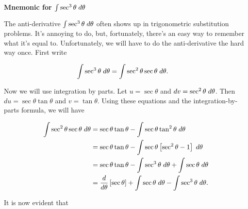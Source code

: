 \documentclass[12pt]{article}
\begin{document}

\begin{Large}
\begin{center}
    \textbf{Mnemonic for $\int \sec^3\theta \hspace{1mm} d\theta$}
\end{center}
\end{Large}

\vspace{5mm}

\noindent The anti-derivative $\int \sec^3\theta \hspace{1mm} d\theta$ often shows up in trigonometric substitution problems. It's annoying to do, but, fortunately, there's an easy way to remember what it's equal to. Unfortunately, we will have to do the anti-derivative the hard way once. First write

\begin{align*}
    \int\sec^3\theta \hspace{1mm} d\theta &= \int\sec^2\theta\sec\theta \hspace{1mm} d\theta.
\end{align*}

\noindent Now we will use integration by parts. Let $u=\sec\theta$ and $dv = \sec^2\theta \hspace{1mm} d\theta$. Then $du = \sec\theta\tan\theta$ and $v=\tan\theta$. Using these equations and the integration-by-parts formula, we will have

\begin{align*}
    \int\sec^2\theta\sec\theta \hspace{1mm} d\theta &= \sec\theta\tan\theta - \int\sec\theta\tan^2\theta \hspace{1mm} d\theta \\
    &= \sec\theta\tan\theta - \int\sec\theta\left[\sec^2\theta-1\right] \hspace{1mm} d\theta \\
    &= \sec\theta\tan\theta - \int\sec^3\theta \hspace{1mm} d\theta + \int\sec\theta \hspace{1mm} d\theta \\
    &= \frac{d}{d\theta}\left[\sec\theta\right] + \int\sec\theta \hspace{1mm} d\theta - \int\sec^3\theta \hspace{1mm} d\theta.
\end{align*}

\noindent It is now evident that
\end{document}
